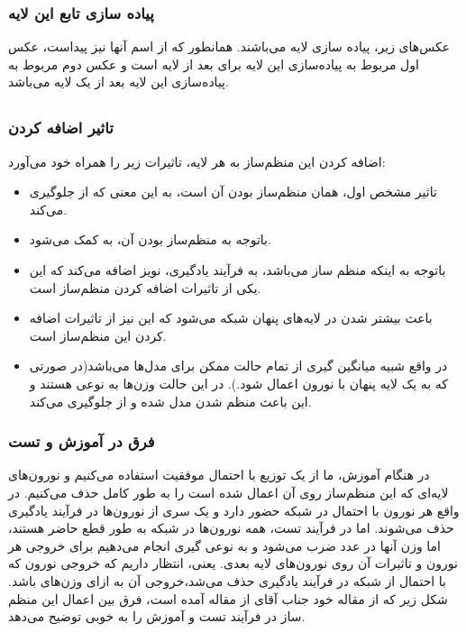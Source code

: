 \documentclass{article}
\begin{document}
\subsubsection{پیاده سازی تابع این لایه}
عکس‌های زیر، پیاده سازی لایه  می‌باشند. همانطور که از اسم آنها نیز پیداست، عکس اول مربوط به پیاده‌سازی این لایه برای بعد از لایه  است و عکس دوم مربوط به پیاده‌سازی این لایه بعد از یک لایه  می‌باشد.
\subsection{}
\subsubsection{تاثیر اضافه کردن }
اضافه کردن این منظم‌ساز به هر لایه، تاثیرات زیر را همراه خود می‌آورد:
\begin{itemize}
	\item تاثیر مشخص اول، همان منظم‌ساز بودن آن است، به این معنی که از  جلوگیری می‌کند.
	\item باتوجه به منظم‌ساز بودن آن، به  کمک می‌شود.
	\item باتوجه به اینکه منظم ‌ساز می‌باشد، به فرآیند یادگیری، نویز اضافه می‌کند که این یکی از تاثیرات اضافه کردن منظم‌ساز است.
	\item باعث بیشتر شدن  در لایه‌های پنهان شبکه‌ می‌شود که این نیز از تاثیرات اضافه کردن این منظم‌ساز است.
	\item در واقع شبیه میانگین گیری از تمام  حالت ممکن برای مدل‌ها می‌باشد(در صورتی که به یک لایه پنهان با  نورون اعمال شود.). در این حالت وزن‌ها به نوعی  هستند و این باعث منظم شدن مدل شده و از  جلوگیری می‌کند.
\end{itemize} 
\subsubsection{فرق در آموزش و تست}
در هنگام آموزش، ما از یک توزیع  با احتمال موفقیت استفاده می‌کنیم و نورون‌های لایه‌ای که این منظم‌ساز روی آن اعمال شده است را به طور کامل حذف می‌کنیم. در واقع هر نورون با احتمال  در شبکه حضور دارد و یک سری از نورون‌ها در فرآیند یادگیری حذف می‌شوند. اما در فرآیند تست، همه نورون‌ها در شبکه به طور قطع حاضر هستند، اما وزن آنها در عدد  ضرب می‌شود و به نوعی  گیری انجام می‌دهیم برای خروجی هر نورون و تاثیرات آن روی نورون‌های لایه بعدی. یعنی، انتظار داریم که خروجی نورون که با احتمال  از شبکه‌ در فرآیند یادگیری حذف می‌شد،‌خروجی آن به ازای وزن‌های  باشد. شکل زیر که از مقاله خود جناب آقای  از مقاله  آمده است، فرق بین اعمال این منظم ساز در فرآیند تست و آموزش را به خوبی توضیح می‌دهد.
\end{document}
